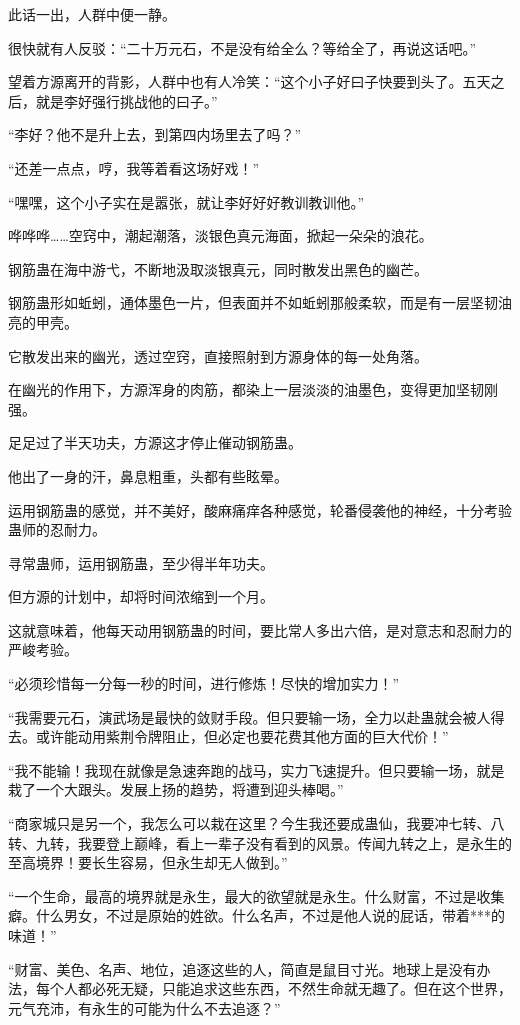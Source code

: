 \begin{this_body}
此话一出，人群中便一静。

很快就有人反驳：“二十万元石，不是没有给全么？等给全了，再说这话吧。”

望着方源离开的背影，人群中也有人冷笑：“这个小子好曰子快要到头了。五天之后，就是李好强行挑战他的曰子。”

“李好？他不是升上去，到第四内场里去了吗？”

“还差一点点，哼，我等着看这场好戏！”

“嘿嘿，这个小子实在是嚣张，就让李好好好教训教训他。”

哗哗哗……空窍中，潮起潮落，淡银色真元海面，掀起一朵朵的浪花。

钢筋蛊在海中游弋，不断地汲取淡银真元，同时散发出黑色的幽芒。

钢筋蛊形如蚯蚓，通体墨色一片，但表面并不如蚯蚓那般柔软，而是有一层坚韧油亮的甲壳。

它散发出来的幽光，透过空窍，直接照射到方源身体的每一处角落。

在幽光的作用下，方源浑身的肉筋，都染上一层淡淡的油墨色，变得更加坚韧刚强。

足足过了半天功夫，方源这才停止催动钢筋蛊。

他出了一身的汗，鼻息粗重，头都有些眩晕。

运用钢筋蛊的感觉，并不美好，酸麻痛痒各种感觉，轮番侵袭他的神经，十分考验蛊师的忍耐力。

寻常蛊师，运用钢筋蛊，至少得半年功夫。

但方源的计划中，却将时间浓缩到一个月。

这就意味着，他每天动用钢筋蛊的时间，要比常人多出六倍，是对意志和忍耐力的严峻考验。

“必须珍惜每一分每一秒的时间，进行修炼！尽快的增加实力！”

“我需要元石，演武场是最快的敛财手段。但只要输一场，全力以赴蛊就会被人得去。或许能动用紫荆令牌阻止，但必定也要花费其他方面的巨大代价！”

“我不能输！我现在就像是急速奔跑的战马，实力飞速提升。但只要输一场，就是栽了一个大跟头。发展上扬的趋势，将遭到迎头棒喝。”

“商家城只是另一个，我怎么可以栽在这里？今生我还要成蛊仙，我要冲七转、八转、九转，我要登上巅峰，看上一辈子没有看到的风景。传闻九转之上，是永生的至高境界！要长生容易，但永生却无人做到。”

“一个生命，最高的境界就是永生，最大的欲望就是永生。什么财富，不过是收集癖。什么男女，不过是原始的姓欲。什么名声，不过是他人说的屁话，带着***的味道！”

“财富、美色、名声、地位，追逐这些的人，简直是鼠目寸光。地球上是没有办法，每个人都必死无疑，只能追求这些东西，不然生命就无趣了。但在这个世界，元气充沛，有永生的可能为什么不去追逐？”


\end{this_body}
